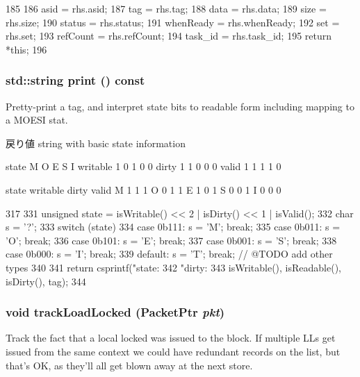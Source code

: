 \begin{DoxyCode}
185     {
186         asid = rhs.asid;
187         tag = rhs.tag;
188         data = rhs.data;
189         size = rhs.size;
190         status = rhs.status;
191         whenReady = rhs.whenReady;
192         set = rhs.set;
193         refCount = rhs.refCount;
194         task_id = rhs.task_id;
195         return *this;
196     }
\end{DoxyCode}
\hypertarget{classCacheBlk_ae8a5b5e9e0e6be3b115ee77fa7b4d0c8}{
\subsubsection[{print}]{\setlength{\rightskip}{0pt plus 5cm}std::string print () const}}
\label{classCacheBlk_ae8a5b5e9e0e6be3b115ee77fa7b4d0c8}
Pretty-\/print a tag, and interpret state bits to readable form including mapping to a MOESI stat.

\begin{DoxyReturn}{戻り値}
string with basic state information 
\end{DoxyReturn}


state M O E S I writable 1 0 1 0 0 dirty 1 1 0 0 0 valid 1 1 1 1 0

state writable dirty valid M 1 1 1 O 0 1 1 E 1 0 1 S 0 0 1 I 0 0 0


\begin{DoxyCode}
317     {
331         unsigned state = isWritable() << 2 | isDirty() << 1 | isValid();
332         char s = '?';
333         switch (state) {
334           case 0b111: s = 'M'; break;
335           case 0b011: s = 'O'; break;
336           case 0b101: s = 'E'; break;
337           case 0b001: s = 'S'; break;
338           case 0b000: s = 'I'; break;
339           default:    s = 'T'; break; // @TODO add other types
340         }
341         return csprintf("state: %
342                         "dirty: %
343                         isWritable(), isReadable(), isDirty(), tag);
344     }
\end{DoxyCode}
\hypertarget{classCacheBlk_ad317aec11d97a72993e653755fa1c003}{
\subsubsection[{trackLoadLocked}]{\setlength{\rightskip}{0pt plus 5cm}void trackLoadLocked ({\bf PacketPtr} {\em pkt})}}
\label{classCacheBlk_ad317aec11d97a72993e653755fa1c003}
Track the fact that a local locked was issued to the block. If multiple LLs get issued from the same context we could have redundant records on the list, but that's OK, as they'll all get blown away at the next store. 


